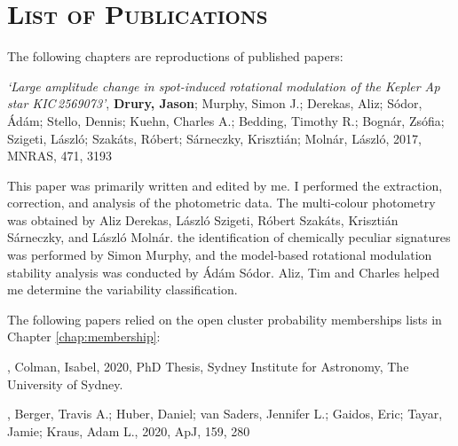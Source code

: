 \chapter*{\textsc{List of Publications}}

The following chapters are reproductions of published papers:

\vspace{0.7cm}

 {\it `Large amplitude change in spot-induced rotational modulation of the Kepler Ap star KIC\,2569073'}, {\bf Drury, Jason}; Murphy, Simon J.; Derekas, Aliz; S\'odor, \'Ad\'am; Stello, Dennis; Kuehn, Charles A.; Bedding, Timothy R.; Bogn\'ar, Zs\'ofia; Szigeti, L\'aszl\'o; Szak\'ats, R\'obert; S\'arneczky, Kriszti\'an; Moln\'ar, L\'aszl\'o, 2017, MNRAS, 471, 3193
\vspace{0.4cm}

This paper was primarily written and edited by me. I performed the extraction, correction, and analysis of the photometric data. The multi-colour photometry was obtained by Aliz Derekas, L\'aszl\'o Szigeti, R\'obert Szak\'ats, Kriszti\'an S\'arneczky, and L\'aszl\'o Moln\'ar. the identification of chemically peculiar signatures was performed by Simon Murphy, and the model-based rotational modulation stability analysis was conducted by Ádám Sódor. Aliz, Tim and Charles helped me determine the variability classification.

\vspace{0.8cm}

\noindent The following papers relied on the open cluster probability memberships lists in Chapter \ref{chap:membership}:

\vspace{0.7cm}

, Colman, Isabel, 2020, PhD Thesis, Sydney Institute for Astronomy, The University of Sydney.
\vspace{0.4cm}

, Berger, Travis A.; Huber, Daniel; van Saders, Jennifer L.; Gaidos, Eric; Tayar, Jamie; Kraus, Adam L., 2020, ApJ, 159, 280
\vspace{0.4cm}
